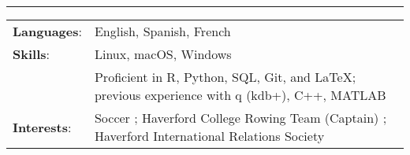 \documentclass[paper=a4, fontsize=11pt]{scrartcl} %
\begin{document}
\vspace{-3mm}
\rule{\textwidth}{0.4pt}

\vspace{1.5mm}

\begin{tabularx}{\linewidth}{ll}

\hspace{-3mm}
\textbf{Languages}: & English, Spanish, French \\
[1mm]

\hspace{-3mm}
\textbf{Skills}: & Linux, macOS, Windows \\
  & Proficient in R, Python, SQL, Git, and \LaTeX; previous experience with q (kdb+), C++, MATLAB\\[1mm]

\hspace{-3mm}
\textbf{Interests}: & Soccer ; Haverford College Rowing Team (Captain) ; Haverford International Relations Society \\ [1mm]


\end{tabularx}
\end{document}
